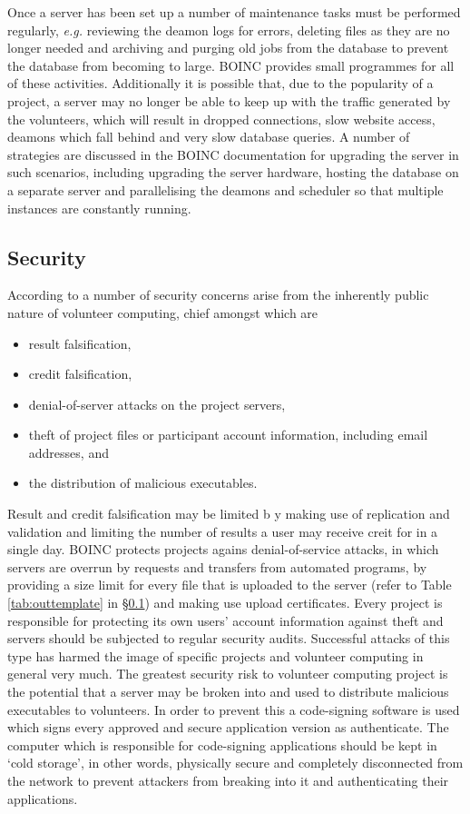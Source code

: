 Once a server has been set up a number of maintenance tasks must be performed regularly, \emph{e.g.} reviewing the deamon logs for errors, deleting files as they are no longer needed and archiving  and purging old jobs from the database to prevent the database from becoming to large. BOINC provides small programmes for all of these activities. Additionally it is possible that, due to the popularity of a project, a server may no longer be able to keep up with  the traffic generated by the volunteers, which will result in dropped connections, slow website access, deamons which fall behind and very slow database queries. A number of strategies are discussed in the BOINC documentation for upgrading the server in such scenarios, including upgrading the server hardware,  hosting the database on a separate server and  parallelising the deamons and scheduler so that multiple instances are constantly running.

\subsection{Security}
According to \cite{boincwiki} a number of security concerns arise from the inherently public nature of volunteer computing, chief amongst which are
\begin{itemize}
\item result falsification,
\item credit falsification,
\item denial-of-server attacks on the project servers, 
\item theft of project files or participant account information, including email addresses, and
\item the distribution of malicious executables.
\end{itemize}
Result and credit falsification may be limited b y making use of replication and validation and limiting the number of results a user may receive creit for in a single day. 
BOINC protects projects agains denial-of-service attacks, in which servers are overrun by requests and transfers from automated programs, by providing a size limit for every file that is uploaded to the server (refer to Table \ref{tab:outtemplate} in \S \ref{}) and making use upload certificates. Every project is responsible for protecting its own users' account information against theft and servers should be subjected to regular security audits. Successful attacks of this type has harmed the image of specific projects and volunteer computing in general very much. \cite{son}
The greatest security risk to volunteer computing project is the potential that a server may be broken into and used to distribute malicious executables to volunteers. In order to prevent this a code-signing software is used which signs every approved and secure application version as authenticate. The computer which is responsible for code-signing applications should be kept in `cold storage', in other words, physically secure and completely disconnected from the network to prevent attackers from breaking into it and authenticating their applications. 


